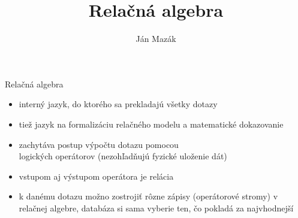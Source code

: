 \documentclass[12pt]{beamer}
\title{Relačná algebra}
\author{Ján Mazák}
\institute{FMFI UK Bratislava}
\date{}
\begin{document}
\frame{\titlepage}

\begin{frame}[fragile]{Relačná algebra}
\begin{itemize}
    \item interný jazyk, do ktorého sa prekladajú všetky dotazy
    \item tiež jazyk na formalizáciu relačného modelu a matematické dokazovanie
    \item zachytáva postup výpočtu dotazu pomocou\\ \alert{logických operátorov} (nezohľadňujú fyzické uloženie dát)
    \item vstupom aj výstupom operátora je relácia
    \item k danému dotazu možno zostrojiť rôzne zápisy (operátorové stromy) v relačnej algebre, databáza si sama vyberie ten, čo pokladá za najvhodnejší
\end{itemize}
\end{frame}
\end{document}
